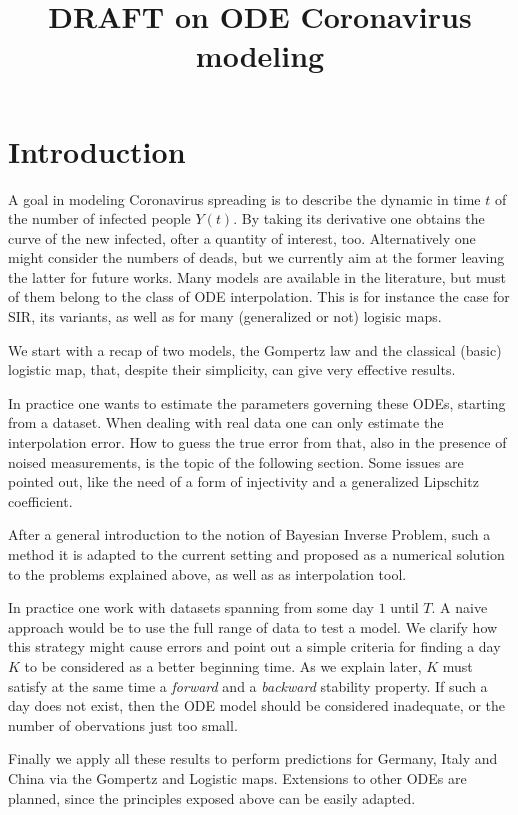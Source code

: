 \documentclass[6pt]{article}
\title {DRAFT on ODE Coronavirus modeling}
\begin{document}
\maketitle
\section{Introduction}
A goal in modeling Coronavirus spreading is to describe the dynamic in 
time $t$ of the number of infected people $Y(t)$.
By taking its derivative one obtains the curve of the new infected,
ofter a quantity of interest, too.
Alternatively one might consider the numbers of deads, but we currently
aim at the former leaving the latter for future works.
Many models are available in the literature, but must of them belong to the
class of ODE interpolation. This is for instance the case for SIR, its
variants, as well as for many (generalized or not) logisic maps.

We start with a recap of two models, the Gompertz law and the classical
(basic) logistic map, that, despite their simplicity,
can give very effective results.

In practice one wants to estimate the parameters governing these ODEs,
starting from a dataset. When dealing with real data one can only estimate
the interpolation error. How to guess the true error from that, also
in the presence of noised measurements, is the topic of the following
section. Some issues are pointed out, like the need of a form of
injectivity and a generalized Lipschitz coefficient.

After a general introduction to the notion of Bayesian Inverse Problem,
such a method it is adapted to the current setting and proposed as a numerical
solution to the problems explained above, as well as as interpolation tool. 


In practice one work with datasets spanning from some day $1$ until $T$.
A naive approach would be to use the full range of data to test a model.
We clarify how this strategy might cause errors and point out a simple
criteria for finding a day $K$ to be considered as a better beginning time.
As we explain later, $K$ must satisfy at the same time a \emph{forward} and
a \emph{backward} stability property. If such a day does not exist,
then the ODE model should be considered inadequate, or the number of
obervations just too small.


Finally we apply all these results to perform predictions for Germany,
Italy and China via the Gompertz and Logistic maps. Extensions to other
ODEs are planned, since the principles exposed above can be easily adapted.
\end{document}
